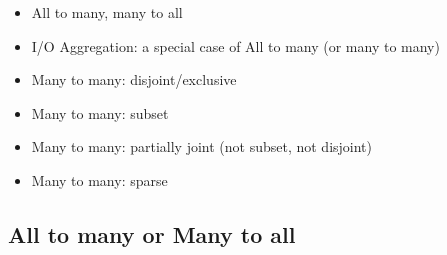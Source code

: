 \begin{itemize}
\item All to many, many to all
\item I/O Aggregation: a special case of All to many (or many to many)
\item Many to many: disjoint/exclusive
\item Many to many: subset
\item Many to many: partially joint (not subset, not disjoint)
\item Many to many: sparse
\end{itemize}

\subsection{All to many or Many to all}
